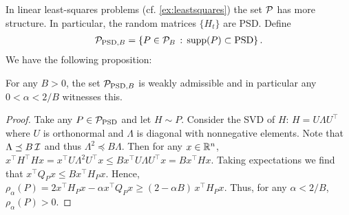 \documentclass{article}
\begin{document}
In linear least-squares problems (cf. \cref{ex:leastsquares}) the set $\P$ has more structure.
In particular, the random matrices $\{H_t\}$ are PSD. 
Define
\begin{align*}
\P_{\text{PSD},B} = \{ P \in \P_B \,:\,  \supp(P)\subset \text{PSD} \}\,.
\end{align*}
We have the following proposition:
\begin{proposition}
For any $B>0$, the set $\P_{\text{PSD},B}$ is weakly admissible
and in particular any $0<\alpha < 2/B$ witnesses this.
\end{proposition}
\begin{proof}
Take any $P\in \P_{\text{PSD}}$ and let $H\sim P$.
Consider the SVD of $H$: $H = U \Lambda U^\top$ where $U$ is orthonormal and $\Lambda$ is diagonal with
nonnegative elements. Note that $\Lambda \preceq B\, \I$ and thus $\Lambda^2 \preceq B \Lambda$.
Then for any $x\in \R^n$, $x^\top H^\top H x = x^\top U \Lambda^2 U^\top x \le B x^\top U \Lambda U^\top x = B x^\top H x$.
Taking expectations we find that $x^\top Q_P x \le B x^\top H_P x$.
Hence, $\rho_\alpha(P) = 2 x^\top H_P x - \alpha x^\top Q_P x \ge (2- \alpha B ) \,x^\top H_P x $.
Thus, for any $\alpha<2/B$, $\rho_\alpha(P)>0$.
\end{proof}
\end{document}
